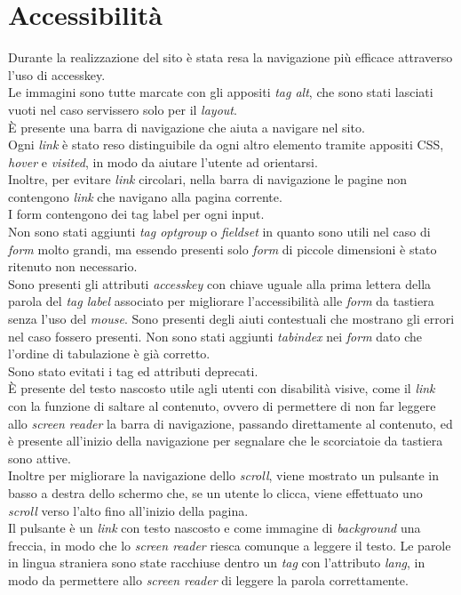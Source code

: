 \section{Accessibilità}
Durante la realizzazione del sito è stata resa la navigazione più efficace attraverso l'uso di accesskey.\\
Le immagini sono tutte marcate con gli appositi \textit{tag alt}, che sono stati lasciati vuoti nel caso servissero solo per il \textit{layout}.\\
È presente una barra di navigazione che aiuta a navigare nel sito.\\ 
Ogni \textit{link} è stato reso distinguibile da ogni altro elemento tramite appositi CSS, \textit{hover} e \textit{visited}, in modo da aiutare l'utente ad orientarsi. \\
Inoltre, per evitare \textit{link} circolari, nella barra di navigazione le pagine non contengono \textit{link} che navigano alla pagina corrente.\\
I form contengono dei tag label per ogni input.\\ 
Non sono stati aggiunti \textit{tag optgroup} o \textit{fieldset} in quanto sono utili nel caso di \textit{form} molto grandi, ma essendo presenti solo \textit{form} di piccole dimensioni è stato ritenuto non necessario.\\ 
Sono presenti gli attributi \textit{accesskey} con chiave uguale alla prima lettera della parola del \textit{tag label} associato per migliorare l'accessibilità alle \textit{form} da tastiera senza l'uso del \textit{mouse}. 
Sono presenti degli aiuti contestuali che mostrano gli errori nel caso fossero presenti. Non sono stati aggiunti \textit{tabindex} nei \textit{form} dato che l'ordine di tabulazione è già corretto.\\
Sono stato evitati i tag ed attributi deprecati.\\
È presente del testo nascosto utile agli utenti con disabilità visive, come il \textit{link} con la funzione  di saltare al contenuto, ovvero di permettere di non far leggere allo \textit{screen reader} la barra di navigazione, passando direttamente al contenuto, ed è presente all'inizio della navigazione
 per segnalare che le scorciatoie da tastiera sono attive.\\
Inoltre per migliorare la navigazione dello \textit{scroll}, viene mostrato un pulsante in basso
a destra dello schermo che, se un utente lo clicca, viene effettuato uno \textit{scroll} verso l'alto fino all'inizio della pagina.\\
Il pulsante è un \textit{link} con testo nascosto e come immagine di \textit{background} una freccia, in modo che lo \textit{screen reader} riesca comunque a leggere il testo.
Le parole in lingua straniera sono state racchiuse dentro un \textit{tag} con l'attributo \textit{lang}, in modo da permettere allo \textit{screen reader} di leggere la parola correttamente.
